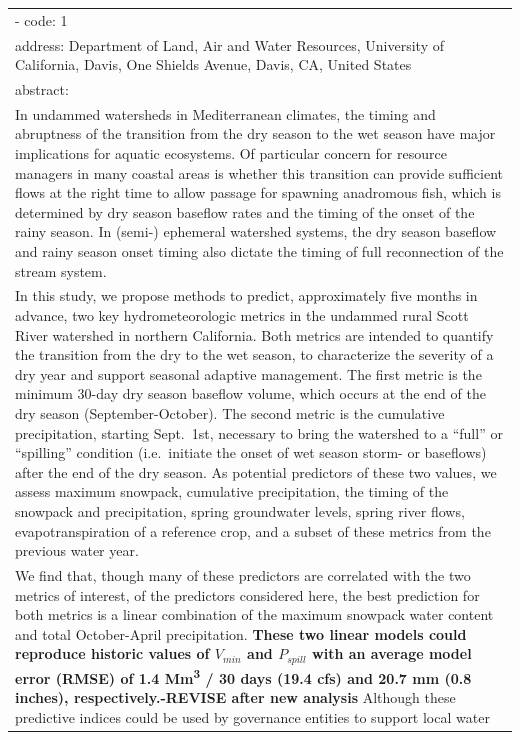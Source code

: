 \documentclass[
]{article}
\begin{document}
\begin{longtable}[]{@{}l@{}}
- code: 1 \\
address: Department of Land, Air and Water Resources, University of
California, Davis, One Shields Avenue, Davis, CA, United States \\
abstract: \textbar{} \\
In undammed watersheds in Mediterranean climates, the timing and
abruptness of the transition from the dry season to the wet season have
major implications for aquatic ecosystems. Of particular concern for
resource managers in many coastal areas is whether this transition can
provide sufficient flows at the right time to allow passage for spawning
anadromous fish, which is determined by dry season baseflow rates and
the timing of the onset of the rainy season. In (semi-) ephemeral
watershed systems, the dry season baseflow and rainy season onset timing
also dictate the timing of full reconnection of the stream system. \\
In this study, we propose methods to predict, approximately five months
in advance, two key hydrometeorologic metrics in the undammed rural
Scott River watershed in northern California. Both metrics are intended
to quantify the transition from the dry to the wet season, to
characterize the severity of a dry year and support seasonal adaptive
management. The first metric is the minimum 30-day dry season baseflow
volume, which occurs at the end of the dry season (September-October).
The second metric is the cumulative precipitation, starting Sept.~1st,
necessary to bring the watershed to a ``full'' or ``spilling'' condition
(i.e.~initiate the onset of wet season storm- or baseflows) after the
end of the dry season. As potential predictors of these two values, we
assess maximum snowpack, cumulative precipitation, the timing of the
snowpack and precipitation, spring groundwater levels, spring river
flows, evapotranspiration of a reference crop, and a subset of these
metrics from the previous water year. \\
We find that, though many of these predictors are correlated with the
two metrics of interest, of the predictors considered here, the best
prediction for both metrics is a linear combination of the maximum
snowpack water content and total October-April precipitation.
\textbf{These two linear models could reproduce historic values of
\(V_{min}\) and \(P_{spill}\) with an average model error (RMSE) of 1.4
Mm\textsuperscript{3} / 30 days (19.4 cfs) and 20.7 mm (0.8 inches),
respectively.-REVISE after new analysis } Although these predictive
indices could be used by governance entities to support local water

\end{longtable}
\end{document}
